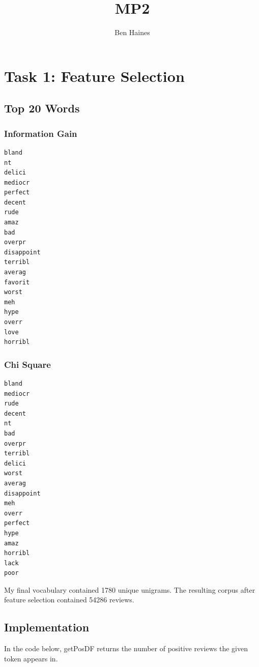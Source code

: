 \documentclass[paper=a4, fontsize=11pt]{jhwhw} %
\begin{document}
\title{MP2}
\author{Ben Haines}

\section{Task 1: Feature Selection}
\subsection{Top 20 Words}
\subsubsection{Information Gain}
\begin{verbatim}
bland
nt
delici
mediocr
perfect
decent
rude
amaz
bad
overpr
disappoint
terribl
averag
favorit
worst
meh
hype
overr
love
horribl
\end{verbatim}
\subsubsection{Chi Square}
\begin{verbatim}
bland
mediocr
rude
decent
nt
bad
overpr
terribl
delici
worst
averag
disappoint
meh
overr
perfect
hype
amaz
horribl
lack
poor
\end{verbatim}

My final vocabulary contained 1780 unique unigrams. The resulting corpus after feature
selection contained 54286 reviews.

\subsection{Implementation}
In the code below, getPosDF returns the number of positive reviews the given token appears in.
\end{document}
